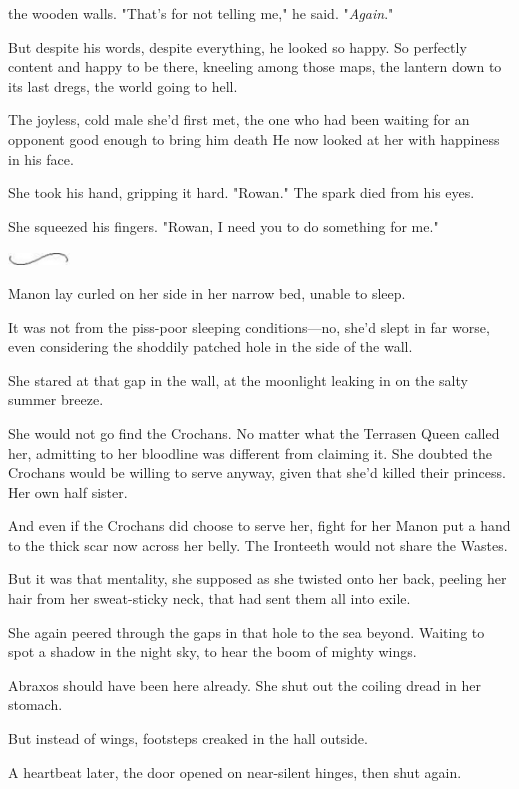 the wooden walls. "That's for not telling me," he said. "\emph{Again}."

But despite his words, despite everything, he looked so  happy. So perfectly content and happy to be there, kneeling among those maps, the lantern down to its last dregs, the world going to hell.

The joyless, cold male she'd first met, the one who had been waiting for an opponent good enough to bring him death  He now looked at her with happiness in his face.

She took his hand, gripping it hard. "Rowan." The spark died from his eyes.

She squeezed his fingers. "Rowan, I need you to do something for me."

\includegraphics[width=0.65in,height=0.13in]{images/seperator}

Manon lay curled on her side in her narrow bed, unable to sleep.

It was not from the piss-poor sleeping conditions---no, she'd slept in far worse, even considering the shoddily patched hole in the side of the wall.

She stared at that gap in the wall, at the moonlight leaking in on the salty summer breeze.

She would not go find the Crochans. No matter what the Terrasen Queen called her, admitting to her bloodline was different from 
claiming it. She doubted the Crochans would be willing to serve anyway, given that she'd killed their princess. Her own half sister.

And even if the Crochans did choose to serve her, fight for her 
Manon put a hand to the thick scar now across her belly. The Ironteeth would not share the Wastes.

But it was that mentality, she supposed as she twisted onto her back, peeling her hair from her sweat-sticky neck, that had sent them all into exile.

She again peered through the gaps in that hole to the sea beyond. Waiting to spot a shadow in the night sky, to hear the boom of mighty wings.

Abraxos should have been here already. She shut out the coiling dread in her stomach.

But instead of wings, footsteps creaked in the hall outside.

A heartbeat later, the door opened on near-silent hinges, then shut again.

